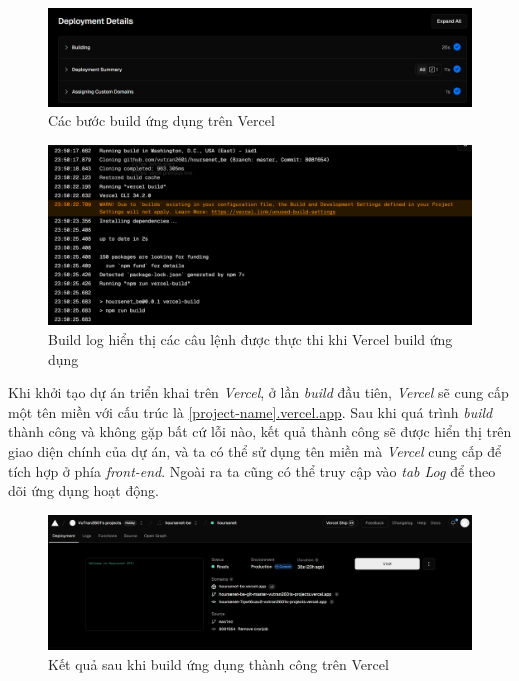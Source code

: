 \begin{figure}[H]
    \centering
    \includegraphics[width=1\textwidth]{Images/Deployment/Backend/DeploymentDetail.png}
    \caption{Các bước build ứng dụng trên Vercel}
\end{figure}
\begin{figure}[H]
    \centering
    \includegraphics[width=1\textwidth]{Images/Deployment/Backend/BuildLog.png}
    \caption{Build log hiển thị các câu lệnh được thực thi khi Vercel build ứng dụng}
\end{figure}
\hspace*{1cm}
Khi khởi tạo dự án triển khai trên \textit{Vercel}, ở lần \textit{build} đầu tiên, \textit{Vercel} sẽ cung cấp một tên miền với cấu trúc là \url{[project-name].vercel.app}. Sau khi quá trình \textit{build} thành công và không gặp bất cứ lỗi nào, kết quả thành công sẽ được hiển thị trên giao diện chính của dự án, và ta có thể sử dụng tên miền mà \textit{Vercel} cung cấp để tích hợp ở phía \textit{front-end}. Ngoài ra ta cũng có thể truy cập vào \textit{tab Log} để theo dõi ứng dụng hoạt động.
\begin{figure}[H]
    \centering
    \includegraphics[width=1\textwidth]{Images/Deployment/Backend/SuccessfullyBuilt.png}
    \caption{Kết quả sau khi build ứng dụng thành công trên Vercel}
\end{figure}